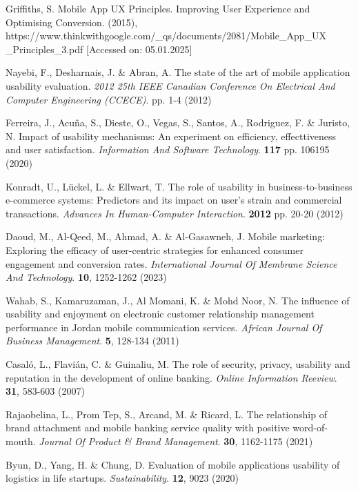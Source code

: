 \documentclass[preprint,12pt,number]{elsarticle}
\begin{document}
\begin{thebibliography}{00}
Griffiths, S. Mobile App UX Principles. Improving User Experience and Optimising Conversion.  (2015), https://www.thinkwithgoogle.com/\_qs/documents/2081/Mobile\_App\_UX \_Principles\_3.pdf [Accessed on: 05.01.2025]

Nayebi, F., Desharnais, J. \& Abran, A. The state of the art of mobile application usability evaluation. {\em 2012 25th IEEE Canadian Conference On Electrical And Computer Engineering (CCECE)}. pp. 1-4 (2012)

Ferreira, J., Acuña, S., Dieste, O., Vegas, S., Santos, A., Rodriguez, F. \& Juristo, N. Impact of usability mechanisms: An experiment on efficiency, effecttiveness and user satisfaction. {\em Information And Software Technology}. \textbf{117} pp. 106195 (2020)

Konradt, U., Lückel, L. \& Ellwart, T. The role of usability in business-to-business e-commerce systems: Predictors and its impact on user's strain and commercial transactions. {\em Advances In Human-Computer Interaction}. \textbf{2012} pp. 20-20 (2012)

Daoud, M., Al-Qeed, M., Ahmad, A. \& Al-Gasawneh, J. Mobile marketing: Exploring the efficacy of user-centric strategies for enhanced consumer engagement and conversion rates. {\em International Journal Of Membrane Science And Technology}. \textbf{10}, 1252-1262 (2023)

Wahab, S., Kamaruzaman, J., Al Momani, K. \& Mohd Noor, N. The influence of usability and enjoyment on electronic customer relationship management performance in Jordan mobile communication services. {\em African Journal Of Business Management}. \textbf{5}, 128-134 (2011)

Casaló, L., Flavián, C. \& Guinaliu, M. The role of security, privacy, usability and reputation in the development of online banking. {\em Online Information Reeview}. \textbf{31}, 583-603 (2007)

Rajaobelina, L., Prom Tep, S., Arcand, M. \& Ricard, L. The relationship of brand attachment and mobile banking service quality with positive word-of-mouth. {\em Journal Of Product \& Brand Management}. \textbf{30}, 1162-1175 (2021)

Byun, D., Yang, H. \& Chung, D. Evaluation of mobile applications usability of logistics in life startups. {\em Sustainability}. \textbf{12}, 9023 (2020)    


\end{thebibliography}
\end{document}

